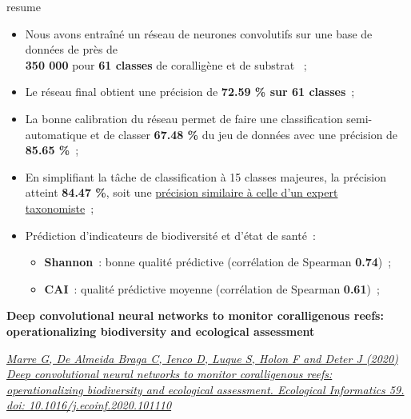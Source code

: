 \setlength{\fboxsep}{8pt}
\setlength{\fboxrule}{0pt}
\begin{center}
\begin{colbox}{resume}
  \vspace{-2pt}
{\color{textresume}\small
\begin{itemize}[leftmargin=0in]\itemsep3pt
\item Nous avons entraîné un réseau de neurones convolutifs sur une base de données de près de\\ \textbf{350 000} pour \textbf{61 classes} de coralligène et de substrat ~;
\item Le réseau final obtient une précision de \textbf{72.59 \% sur 61 classes}~;
\item La bonne calibration du réseau permet de faire une classification semi-automatique et de classer \textbf{67.48 \%} du jeu de données avec une précision de \textbf{85.65 \%}~;
\item En simplifiant la tâche de classification à 15 classes majeures, la précision atteint \textbf{84.47 \%}, soit une \underline{précision similaire à celle d'un expert taxonomiste}~;
\item Prédiction d'indicateurs de biodiversité et d'état de santé~:
\begin{itemize}
  \item \textbf{Shannon}~: bonne qualité prédictive (corrélation de Spearman \textbf{0.74})~;
  \item \textbf{CAI}~: qualité prédictive moyenne (corrélation de Spearman \textbf{0.61})~;
\end{itemize}
\end{itemize}
}
\vspace{-2pt}
\end{colbox}
\end{center}

\clearpage

\fontsize{14}{14}\noindent\textbf{Deep convolutional neural networks to monitor coralligenous reefs: operationalizing biodiversity and ecological assessment}

\normalsize
\medskip


\noindent\href{https://doi.org/10.1016/j.ecoinf.2020.101110}{\textit{Marre G, De Almeida Braga C, Ienco D, Luque S, Holon F and Deter J (2020) Deep convolutional neural networks to monitor coralligenous reefs: operationalizing biodiversity and ecological assessment. Ecological Informatics 59. doi: 10.1016/j.ecoinf.2020.101110}}


